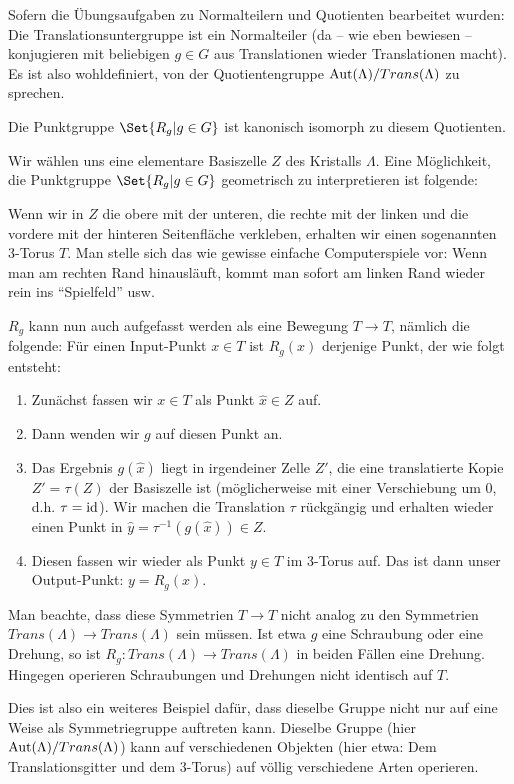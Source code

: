 \begin{remark}
Sofern die Übungsaufgaben zu Normalteilern und Quotienten bearbeitet wurden: Die Translationsuntergruppe ist ein Normalteiler (da -- wie eben bewiesen -- konjugieren mit beliebigen $g\in G$ aus Translationen wieder Translationen macht). Es ist also wohldefiniert, von der Quotientengruppe $\operatorname{Aut}(\Lambda) / Trans(\Lambda)$ zu sprechen.

Die Punktgruppe $\Set{R_g | g\in G}$ ist kanonisch isomorph zu diesem Quotienten.
\end{remark}

\begin{remark}
Wir wählen uns eine elementare Basiszelle $Z$ des Kristalls $\Lambda$. Eine Möglichkeit, die Punktgruppe $\Set{R_g | g\in G}$ geometrisch zu interpretieren ist folgende:

Wenn wir in $Z$ die obere mit der unteren, die rechte mit der linken und die vordere mit der hinteren Seitenfläche verkleben, erhalten wir einen sogenannten 3-Torus $T$. Man stelle sich das wie gewisse einfache Computerspiele vor: Wenn man am rechten Rand hinausläuft, kommt man sofort am linken Rand wieder rein ins \enquote{Spielfeld} usw.

\medbreak
$R_g$ kann nun auch aufgefasst werden als eine Bewegung $T\to T$, nämlich die folgende: Für einen Input-Punkt $x\in T$ ist $R_g(x)$ derjenige Punkt, der wie folgt entsteht:
\begin{enumerate}
\item Zunächst fassen wir $x\in T$ als Punkt $\hat{x}\in Z$ auf.
\item Dann wenden wir $g$ auf diesen Punkt an.
\item Das Ergebnis $g(\hat{x})$ liegt in irgendeiner Zelle $Z'$, die eine translatierte Kopie $Z'=\tau(Z)$ der Basiszelle ist (möglicherweise mit einer Verschiebung um $0$, d.h. $\tau=\operatorname{id}$). Wir machen die Translation $\tau$ rückgängig und erhalten wieder einen Punkt in $\hat{y}=\tau^{-1}(g(\hat{x}))\in Z$.
\item Diesen fassen wir wieder als Punkt $y\in T$ im 3-Torus auf. Das ist dann unser Output-Punkt: $y=R_g(x)$.
\end{enumerate}

Man beachte, dass diese Symmetrien $T\to T$ nicht analog zu den Symmetrien $Trans(\Lambda)\to Trans(\Lambda)$ sein müssen. Ist etwa $g$ eine Schraubung oder eine Drehung, so ist $R_g: Trans(\Lambda) \to Trans(\Lambda)$ in beiden Fällen eine Drehung. Hingegen operieren Schraubungen und Drehungen nicht identisch auf $T$.

Dies ist also ein weiteres Beispiel dafür, dass dieselbe Gruppe nicht nur auf eine Weise als Symmetriegruppe auftreten kann. Dieselbe Gruppe (hier $\operatorname{Aut}(\Lambda) / Trans(\Lambda)$) kann auf verschiedenen Objekten (hier etwa: Dem Translationsgitter und dem 3-Torus) auf völlig verschiedene Arten operieren.
\end{remark}


